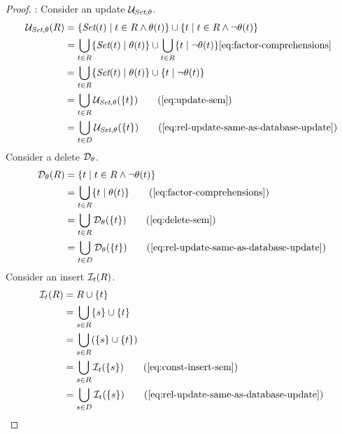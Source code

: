 \begin{proof}
    :
    Consider an update $\mathcal{U}_{\textit{Set},\theta}$.
    \begin{align*}
      \aupdate(R) &= \{ \pset(t) \mid t \in R \wedge \cond(t) \} \cup \{ t \mid t \in R \wedge \neg \cond(t) \}\\
                  &= \bigcup_{t \in R} \{ \pset(t) \mid \cond(t) \} \cup
                    \bigcup_{t \in R} \{ t \mid \neg \cond(t) \} \Cref{eq:factor-comprehensions}\\
                  &= \bigcup_{t \in R} \{ \pset(t) \mid \cond(t) \} \cup \{ t \mid \neg \cond(t) \}\\
                  &= \bigcup_{t \in R}  \aupdate(\{t\}) \tag{\Cref{eq:update-sem}}\\
                  &= \bigcup_{t \in \db}  \aupdate(\{t\}) \tag{\Cref{eq:rel-update-same-as-database-update}}
    \end{align*}
    Consider a delete $\mathcal{D}_{\theta}$.
    \begin{align*}
      \adelete(R) &= \{ t \mid t \in R \wedge \neg \cond(t) \} \\
                  &= \bigcup_{t \in R} \{ t \mid \cond(t) \} \tag{\Cref{eq:factor-comprehensions}}\\
                  &= \bigcup_{t \in R}  \adelete(\{t\}) \tag{\Cref{eq:delete-sem}}\\
                  &= \bigcup_{t \in \db}  \adelete(\{t\}) \tag{\Cref{eq:rel-update-same-as-database-update}}
    \end{align*}
    Consider an insert $\mathcal{I}_{t}(R)$.
    \begin{align*}
      \ainsert(R) &= \rel \union \{ t\}\\
                  &= \bigcup_{s \in R} \{ s \} \union \{ t\}\\
                  &= \bigcup_{s \in R} (\{ s \} \union \{ t\})\\
                  &= \bigcup_{s \in R} \ainsert(\{s\}) \tag{\Cref{eq:const-insert-sem}}\\
                  &= \bigcup_{s \in \db}  \ainsert(\{s\}) \tag{\Cref{eq:rel-update-same-as-database-update}}

\end{align*}
\end{proof}
